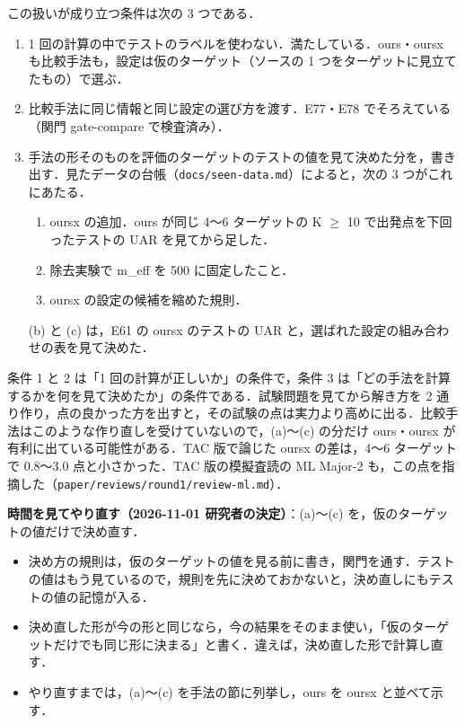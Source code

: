 \documentclass[a4paper,11pt]{ltjsarticle}
\begin{document}
この扱いが成り立つ条件は次の 3 つである．

\begin{enumerate}
\item 1 回の計算の中でテストのラベルを使わない．満たしている．ours・oursx も比較手法も，設定は仮のターゲット（ソースの 1 つをターゲットに見立てたもの）で選ぶ．
\item 比較手法に同じ情報と同じ設定の選び方を渡す．E77・E78 でそろえている（関門 gate-compare で検査済み）．
\item 手法の形そのものを評価のターゲットのテストの値を見て決めた分を，書き出す．見たデータの台帳（\texttt{docs/seen-data.md}）によると，次の 3 つがこれにあたる．
  \begin{enumerate}
  \item oursx の追加．ours が同じ 4〜6 ターゲットの K $\ge$ 10 で出発点を下回ったテストの UAR を見てから足した．
  \item 除去実験で m\_eff を 500 に固定したこと．
  \item oursx の設定の候補を縮めた規則．
  \end{enumerate}
  (b) と (c) は，E61 の oursx のテストの UAR と，選ばれた設定の組み合わせの表を見て決めた．
\end{enumerate}

条件 1 と 2 は「1 回の計算が正しいか」の条件で，条件 3 は「どの手法を計算するかを何を見て決めたか」の条件である．試験問題を見てから解き方を 2 通り作り，点の良かった方を出すと，その試験の点は実力より高めに出る．比較手法はこのような作り直しを受けていないので，(a)〜(c) の分だけ ours・oursx が有利に出ている可能性がある．TAC 版で論じた oursx の差は，4〜6 ターゲットで 0.8〜3.0 点と小さかった．TAC 版の模擬査読の ML Major-2 も，この点を指摘した（\texttt{paper/reviews/round1/review-ml.md}）．

\begin{tcolorbox}
\textbf{時間を見てやり直す（2026-11-01 研究者の決定）}：(a)〜(c) を，仮のターゲットの値だけで決め直す．
\begin{itemize}
\item 決め方の規則は，仮のターゲットの値を見る前に書き，関門を通す．テストの値はもう見ているので，規則を先に決めておかないと，決め直しにもテストの値の記憶が入る．
\item 決め直した形が今の形と同じなら，今の結果をそのまま使い，「仮のターゲットだけでも同じ形に決まる」と書く．違えば，決め直した形で計算し直す．
\item やり直すまでは，(a)〜(c) を手法の節に列挙し，ours を oursx と並べて示す．
\end{itemize}
\end{tcolorbox}
\end{document}
